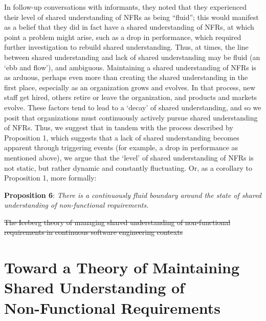 \documentclass[smallextended]{svjour3}        %
\newcommand\cwproposition[2]{
\normalsize 
\vspace{0.5em}%
\noindent \textbf{\sffamily\fontsize{9}{11}\selectfont Proposition #1}: \textit{#2} %
\vspace{0.5em} %
}
\providecommand{\DIFdeltex}[1]{{\protect\color{red}\sout{#1}}} %
\providecommand{\DIFdelbegin}{} %
\providecommand{\DIFdelend}{} %
\providecommand{\DIFdelFL}[1]{\DIFdel{#1}} %
\providecommand{\DIFdel}[1]{\texorpdfstring{\DIFdeltex{#1}}{}} %
\newcommand{\DIFscaledelfig}{0.5}
\newlength{\DIFdelgraphicswidth} %
\newlength{\DIFdelgraphicsheight} %
\newcommand{\DIFdelincludegraphics}[2][]{%
\sbox{\DIFdelgraphicsbox}{\DIFOincludegraphics[#1]{#2}}%
\settoboxwidth{\DIFdelgraphicswidth}{\DIFdelgraphicsbox} %
\settoboxtotalheight{\DIFdelgraphicsheight}{\DIFdelgraphicsbox} %
\scalebox{\DIFscaledelfig}{%
\parbox[b]{\DIFdelgraphicswidth}{\usebox{\DIFdelgraphicsbox}\\[-\baselineskip] \rule{\DIFdelgraphicswidth}{0em}}\llap{\resizebox{\DIFdelgraphicswidth}{\DIFdelgraphicsheight}{%
\setlength{\unitlength}{\DIFdelgraphicswidth}%
\begin{picture}(1,1)%
\thicklines\linethickness{2pt} %
{\color[rgb]{1,0,0}\put(0,0){\framebox(1,1){}}}%
{\color[rgb]{1,0,0}\put(0,0){\line( 1,1){1}}}%
{\color[rgb]{1,0,0}\put(0,1){\line(1,-1){1}}}%
\end{picture}%
}\hspace*{3pt}}} %
} %
\DeclareRobustCommand{\DIFdelbegin}{\DIFOdelbegin \let\includegraphics\DIFdelincludegraphics} %
\DeclareRobustCommand{\DIFdelend}{\DIFOaddend \let\includegraphics\DIFOincludegraphics} %
\begin{document}
In follow-up conversations with informants, they noted that they experienced their level of shared understanding of NFRs as being ``fluid''; this would manifest as a belief that they did in fact have a shared understanding of NFRs, at which point a problem might arise, such as a drop in performance, which required further investigation to rebuild shared understanding.
Thus, at times, the line between shared understanding and lack of shared understanding may be fluid (an `ebb and flow'), and ambiguous. 
Maintaining a shared understanding of NFRs is as arduous, perhaps even more than creating the shared understanding in the first place, especially as an organization grows and evolves. In that process, new staff get hired, others retire or leave the organization, and products and markets evolve. 
These factors tend to lead to a `decay' of shared understanding, and so we posit that organizations must continuously actively pursue shared understanding of NFRs. Thus, we suggest that in tandem with the process described by Proposition 1, which suggests that a lack of shared understanding becomes apparent through triggering events (for example, a drop in performance as mentioned above), we argue that the `level' of shared understanding of NFRs is not static, but rather dynamic and constantly fluctuating. Or, as a corollary to Proposition 1, more formally:


\cwproposition{6}{There is a continuously fluid boundary around the state of shared understanding of non-functional requirements.}









\DIFdelbegin %

{%
\DIFdelFL{The Iceberg theory of managing shared understanding of non-functional requirements in continuous software engineering contexts}}


\DIFdelend \section{Toward a Theory of Maintaining Shared Understanding of\\ Non-Functional Requirements}
\label{sec:discussion}
\end{document}
